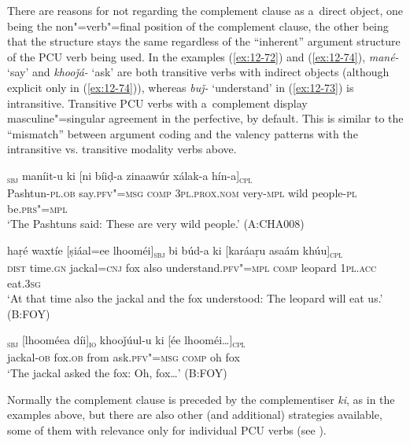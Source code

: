 There are reasons for not regarding the complement clause as a~direct object, one being the non"=verb"=final position of the complement clause, the other being that the structure stays the same regardless of the ``inherent'' argument structure of the PCU verb being used. In the examples (\ref{ex:12-72}) and (\ref{ex:12-74}), \textit{mané-} `say' and \textit{khooǰá-} `ask' are both transitive verbs with indirect objects (although explicit only in (\ref{ex:12-74})), whereas \textit{buǰ-} `understand' in (\ref{ex:12-73}) is intransitive. Transitive PCU verbs with a~complement display masculine"=singular agreement in the perfective, by default. This is similar to the ``mismatch'' between argument coding and the valency patterns with the intransitive vs. transitive modality verbs above.

\begin{exe}
\ex
\label{ex:12-72}
\gll [ɡhueeṇíi-am]\textsubscript{\textsc{sbj}} maníit-u ki [ni bíiḍ-a zinaawúr xálak-a hín-a]\textsubscript{\textsc{cpl}} \\
Pashtun-\textsc{pl.ob} say.\textsc{pfv"=msg} \textsc{c}\textsc{om}\textsc{p} \textsc{3pl.prox.nom} very-\textsc{mpl}  wild people-\textsc{pl} be.\textsc{prs"=mpl} \\
\glt `The Pashtuns said: These are very wild people.' (A:CHA008)
\end{exe}
\begin{exe}
\ex
\label{ex:12-73}
\gll haṛé waxtíe [ṣiáal=ee lhooméi]\textsubscript{\textsc{sbj}} bi búd-a ki \textsc{[}karáaṛu asaám khúu]\textsubscript{\textsc{cpl}} \\
\textsc{dist} time.\textsc{gn} jackal=\textsc{cnj} fox also  understand.\textsc{pfv"=mpl} \textsc{comp} leopard \textsc{1pl.acc} eat.\textsc{3sg} \\
\glt `At that time also the jackal and the fox understood: The leopard will eat us.' (B:FOY)
\end{exe}
\begin{exe}
\ex
\label{ex:12-74}
\gll [ṣiúul-a]\textsubscript{\textsc{sbj}} [lhooméea díi]\textsubscript{\textsc{io}} khooǰúul-u ki [ée lhooméi{\ldots}]\textsubscript{\textsc{cpl}} \\
jackal-\textsc{ob} fox.\textsc{ob} from ask.\textsc{pfv"=msg} \textsc{comp} oh fox \\
\glt `The jackal asked the fox: Oh, fox{\ldots}' (B:FOY)
\end{exe}

Normally the complement clause is preceded by the complementiser \textit{ki}, as in the examples above, but there are also other (and additional) strategies available, some of them with relevance only for individual PCU verbs (see ). 


